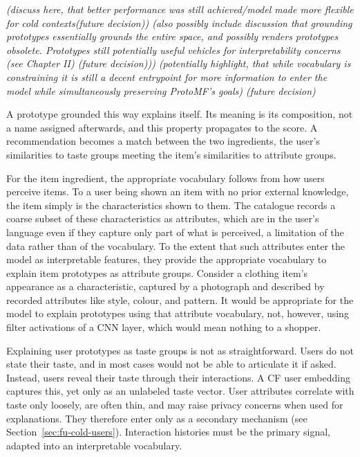 
\textit{(discuss here, that better performance was still achieved/model made
more flexible for cold contexts(future decision)) (also possibly include
discussion that grounding prototypes essentially grounds the entire space, and
possibly renders prototypes obsolete. Prototypes still potentially useful
vehicles for interpretability concerns (see Chapter II) (future decision)))
(potentially highlight, that while vocabulary is constraining it is still a
decent entrypoint for more information to enter the model while simultaneously
preserving ProtoMF's goals) (future decision)}

A prototype grounded this way explains itself. Its meaning is its composition,
not a name assigned afterwards, and this property propagates to the score. A
recommendation becomes a match between the two ingredients, the user's
similarities to taste groups meeting the item's similarities to attribute
groups.

For the item ingredient, the appropriate vocabulary follows from how users
perceive items. To a user being shown an item with no prior external
knowledge, the item simply is the characteristics shown to them. The catalogue
records a coarse subset of these characteristics as attributes, which are in
the user's language even if they capture only part of what is perceived, a
limitation of the data rather than of the vocabulary. To the extent that such
attributes enter the model as interpretable features, they provide the
appropriate vocabulary to explain item prototypes as attribute groups.
Consider a clothing item's appearance as a characteristic, captured by a
photograph and described by recorded attributes like style, colour, and
pattern. It would be appropriate for the model to explain prototypes using
that attribute vocabulary, not, however, using filter activations of a CNN
layer, which would mean nothing to a shopper.

Explaining user prototypes as taste groups is not as straightforward. Users do
not state their taste, and in most cases would not be able to articulate it if
asked. Instead, users reveal their taste through their interactions. A CF user
embedding captures this, yet only as an unlabeled taste vector. User
attributes correlate with taste only loosely, are often thin, and may raise
privacy concerns when used for explanations. They therefore enter only as a
secondary mechanism (see Section~\ref{sec:fu-cold-users}). Interaction
histories must be the primary signal, adapted into an interpretable
vocabulary.


